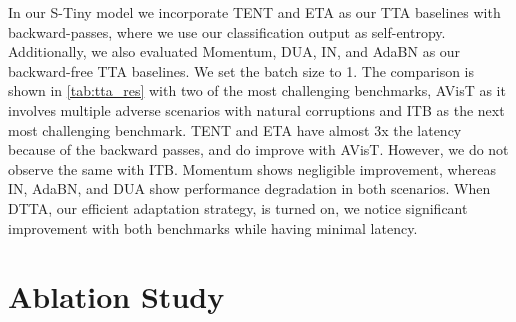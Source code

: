   In our S-Tiny model we incorporate TENT\cite{wang2020tent} and ETA\cite{niu2022efficient} as our TTA baselines with backward-passes,
  where we use our classification output as self-entropy. Additionally, we also evaluated Momentum\cite{schneider2020improving}, DUA\cite{mirza2022norm}, IN\cite{pan2018two}, and AdaBN\cite{li2016revisiting} as our backward-free TTA baselines. We set the batch size to 1. The comparison is shown in \ref{tab:tta_res} with two of the most challenging benchmarks, AVisT as it involves multiple adverse scenarios with natural corruptions and ITB as the next most challenging benchmark.
  TENT and ETA have almost 3x the latency because of the backward passes, and do improve with AVisT. However, we do not observe the same with ITB. Momentum shows negligible improvement, whereas IN, AdaBN, and DUA show performance degradation in both scenarios. When DTTA, our efficient adaptation strategy, is turned on, we notice significant improvement with both benchmarks while having minimal latency.
  \begin{table}[t]
	\caption{Case study on parameter-free dynamic updates. }
	\label{tab:component_ablation_updates}
	\centering
  \end{table}
  
  \section{Ablation Study}\label{sec:ablation}
  
